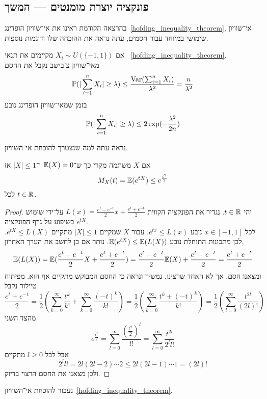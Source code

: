 \subsection{פונקציה יוצרת מומנטים --- המשך}
בהרצאה הקודמת ראינו את אי־שוויון הופדינג\ \ref{hofding_inequality_theorem}, אי־שוויון שימושי במיוחד עבור חסמים, עתה נראה את ההוכחה שלו ודוגמות נוספות.
\begin{example}
	אם $X_i \sim U(\{-1, 1\})$ מקיימים את תנאי \ \ref{hofding_inequality_theorem}. \\
	מאי־שוויון צ'בישב נקבל את החסם
	\[
		\mathbb{P}(| \sum_{i = 1}^{n} X_i | \ge \lambda)
		\le \frac{\operatorname{Var}(\sum_{i = 1}^{n} X_i)}{\lambda^2}
		= \frac{n}{\lambda^2}
	\]
	בזמן שמאי־שוויון הופדינג נובע
	\[
		\mathbb{P}(| \sum_{i = 1}^{n} X_i | \ge \lambda)
		\le 2 \exp(- \frac{\lambda^2}{2n})
	\]
\end{example}
נראה עתה למה שנצטרך להוכחת אי־השוויון.
\begin{lemma}
	אם $X$ משתמה מקרי כך ש־$\mathbb{E}(X) = 0$ ו־$|X| \le 1$ אז
	\[
		M_X(t)
		= \mathbb{E}(e^{tX})
		\le e^{\frac{t^2}{2}}
	\]
	לכל $t \in \mathbb{R}$.
\end{lemma}
\begin{proof}
	יהי $t \in \mathbb{R}$.
	נגדיר את הפונקציה הקווית $L(x) = \frac{e^t - e^{-t}}{2} x + \frac{e^t + e^{-t}}{2}$ על־ידי שימוש בשיפוע על גרף הפונקציה $e^{tX}$. \\
	לכל $x \in [-1, 1]$ נובע $e^{tx} \le L(x)$.
	עבור $X$ שמקיים $|X| \le 1$ מתקיים $e^{tX} \le L(X)$.
	לכן מתכונות התוחלת נובע $\mathbb{E}(e^{tX}) \le \mathbb{E}(L(X))$.
	נותר אם כן לחשב את הערך האחרון,
	\[
		\mathbb{E}(L(X))
		= \mathbb{E}(\frac{e^t - e^{-t}}{2} X + \frac{e^t + e^{-t}}{2})
		= \frac{e^t - e^{-t}}{2} \mathbb{E}(X) + \frac{e^t + e^{-t}}{2}
		= \frac{e^t + e^{-t}}{2}
	\]
	ומצאנו חסם, אך לא האחד שרצינו, נמשיך ונראה כי החסם המבוקש מתקיים אף הוא.
	מפיתוח טיילור נקבל
	\[
		\frac{e^t + e^{-t}}{2}
		= \frac{1}{2} \left(\sum_{k = 0}^{\infty} \frac{t^k}{k!} + \sum_{k = 0}^{\infty} \frac{{(-t)}^k}{k!} \right)
		= \frac{1}{2} \left(\sum_{k = 0}^{\infty} \frac{t^k + {(-t)}^k}{k!}\right)
		= \frac{1}{2} \left(\sum_{l = 0}^{\infty} \frac{t^{2l}}{(2l)!}\right)
	\]
	מהצד השני
	\[
		e^{\frac{t^2}{2}}
		= \sum_{l = 0}^{\infty} \frac{{\left(\frac{t^2}{2}\right)}^l}{l!}
		= \sum_{l = 0}^{\infty} \frac{t^{2l}}{2^l l!}
	\]
	אבל לכל $l \ge 0$ מתקיים
	\[
		2^l l! = 2l (2l - 2) \cdots 2 \le 2 l (2l - 1) \cdots 1 = (2l)!
	\]
	ולכן מצאנו את החסם הרצוי בדיוק.
\end{proof}
נעבור להוכחת אי־השוויון\ \ref{hofding_inequality_theorem}.
